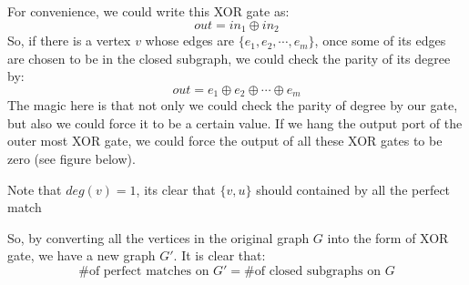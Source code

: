 \documentclass{article}
\begin{document}
For convenience, we could write this XOR gate as:
\[ out = in_1 \oplus in_2 \]
So, if there is a vertex $v$ whose edges are $\{e_1, e_2, \cdots, e_m\}$, once some of its edges are chosen to be in the closed subgraph, we could check the parity of its degree by:
    \[ out = e_1 \oplus e_2 \oplus \cdots \oplus e_m \]
The magic here is that not only we could check the parity of degree by our gate, but also we could force it to be a certain value.
If we hang the output port of the outer most XOR gate, we could force the output of all these XOR gates to be zero (see figure below).

\begin{center}
\end{center}
Note that $deg(v) = 1$, its clear that $\{v, u\}$ should contained by all the perfect match


So, by converting all the vertices in the original graph $G$ into the form of XOR gate, we have a new graph $G'$. It is clear that:
    \[ \mbox{\# of perfect matches on }G' = \mbox{\# of closed subgraphs on }G \]
\end{document}
